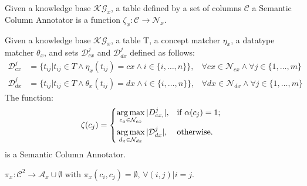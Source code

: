 \documentclass{llncs}
\DeclareMathOperator*{\argmax}{arg\,max}
\begin{document}
\begin{definition}
      Given a knowledge base $\mathcal{KG}_x$, a table defined by a set of columns $\mathcal{C}$ a Semantic Column Annotator is a function $\zeta_x: \mathcal{C}\to \mathcal{N}_x$.
\end{definition}


\begin{lemma}
      Given a knowledge base $\mathcal{KG}_x$, a table T, a concept matcher $\eta_x$, a datatype matcher $\theta_x$, and sets $\mathcal{D}^j_{cx}$ and $\mathcal{D}^j_{dx}$ defined as follows:
      \begin{align*}
            \mathcal{D}^j_{cx} & =\{t_{ij} | t_{ij}\in T \wedge\eta_x(t_{ij}) =cx \wedge i \in \{i,\ldots, n\}\},    & \forall cx \in \mathcal{N}_{cx} \wedge \forall j \in \{1,\ldots,m\} \\
            \mathcal{D}^j_{dx} & =\{t_{ij} | t_{ij}\in T \wedge \theta_x(t_{ij}) =dx \wedge i \in \{i,\ldots, n\}\}, & \forall dx \in \mathcal{N}_{dx} \wedge \forall j \in \{1,\ldots,m\}
      \end{align*}
      The function:
      \begin{equation}
            \zeta(c_{j})=
            \begin{dcases*}
                  \argmax_{c_x\in \mathcal{N}_{cx}}|D^j_{cx,}|, & if $\alpha(c_{j})=1$;
                  \\
                  \argmax_{d_x\in \mathcal{N}_{dx}}|\mathcal{D}^j_{dx}|,& otherwise.
            \end{dcases*}
      \end{equation}
      is a Semantic Column Annotator.
\end{lemma}

\begin{definition}
      $\pi_x:\mathcal{C}^2\to \mathcal{A}_x\cup \emptyset$ with $\pi_x(c_i,c_j) =\emptyset,\, \forall (i,j)| i=j$.
\end{definition}



\end{document}
